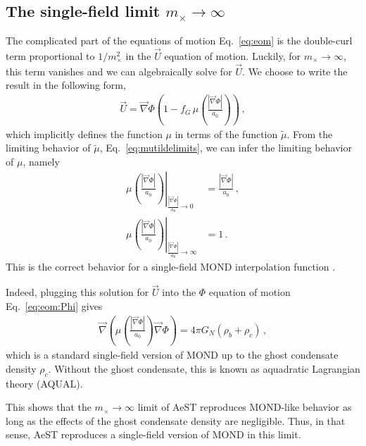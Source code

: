 \documentclass[reprint, amsmath,amssymb, nofootinbib, aps, prd]{revtex4-2}
\begin{document}
\subsection{The single-field limit $m_\times \to \infty$}
\label{sec:singlefield}

The complicated part of the equations of motion Eq.~\eqref{eq:eom} is the double-curl term proportional to $1/m_\times^2$ in the $\vec{U}$ equation of motion.
Luckily, for $m_\times \to \infty$, this term vanishes and we can algebraically solve for $\vec{U}$.
We choose to write the result in the following form,
\begin{align}
 \label{eq:mudef}
 \vec{U} = \vec{\nabla} \Phi \left(1 - f_G \, \mu\left(\frac{|\vec{\nabla} \Phi|}{a_0}\right) \right) \,,
\end{align}
which implicitly defines the function $\mu$ in terms of the function $\tilde{\mu}$.
From the limiting behavior of $\tilde{\mu}$, Eq.~\eqref{eq:mutildelimits}, we can infer the limiting behavior of $\mu$, namely
\begin{subequations}
 \label{eq:muimits}
\begin{align}
 \left.\mu\left(\frac{|\vec{\nabla} \Phi|}{a_0}\right)\right|_{\frac{|\vec{\nabla} \Phi|}{a_0} \to 0} &= \frac{|\vec{\nabla} \Phi|}{a_0} \,, \\
 \left.\mu\left(\frac{|\vec{\nabla} \Phi|}{a_0}\right)\right|_{\frac{|\vec{\nabla} \Phi|}{a_0} \to \infty} &= 1 \,.
\end{align}
\end{subequations}
This is the correct behavior for a single-field MOND interpolation function \citep{Famaey2012}.

Indeed, plugging this solution for $\vec{U}$ into the $\Phi$ equation of motion Eq.~\eqref{eq:eom:Phi} gives
\begin{align}
 \label{eq:eomsingle}
 \vec{\nabla} \left(\mu\left(\frac{|\vec{\nabla} \Phi|}{a_0}\right) \vec{\nabla} \Phi \right) = 4 \pi G_N (\rho_b + \rho_c) \,,
\end{align}
which is a standard single-field version of MOND \citep{Bekenstein1984, Famaey2012} up to the ghost condensate density $\rho_c$.
Without the ghost condensate, this is known as aquadratic Lagrangian theory (AQUAL).

This shows that the $m_\times \to \infty$ limit of AeST reproduces MOND-like behavior as long as the effects of the ghost condensate density are negligible.
Thus, in that sense, AeST reproduces a single-field version of MOND in this limit.
\end{document}
